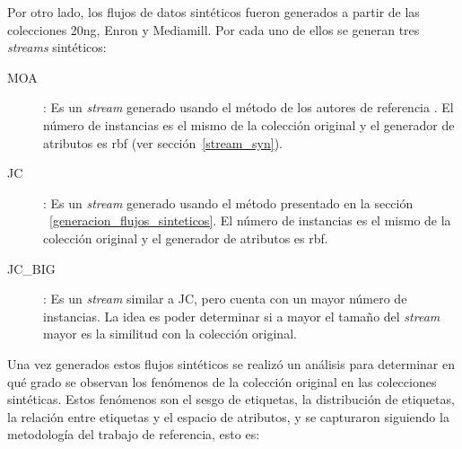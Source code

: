Por otro lado, los flujos de datos sintéticos fueron generados a partir de las
colecciones 20ng, Enron y Mediamill. Por cada uno de ellos se generan tres
\textit{streams} sintéticos:

\begin{description}

	\item[MOA]: Es un \textit{stream} generado usando el método de los autores
	      de referencia \cite{read_generating_2009}. El número de instancias es el
	      mismo de la colección original y el generador de atributos es
	      \acrfull{rbf} (ver sección~\ref{stream_syn}).

	\item[JC]: Es un \textit{stream} generado usando el método presentado en la
	      sección ~\ref{generacion_flujos_sinteticos}. El número de instancias es
	      el mismo de la colección original y el generador de atributos es
	      \acrfull{rbf}.

	\item[JC\_BIG]: Es un \textit{stream} similar a JC, pero cuenta con un mayor
	      número de instancias. La idea es poder determinar si a mayor el tamaño
	      del \textit{stream} mayor es la similitud con la colección original.

\end{description}

Una vez generados estos flujos sintéticos se realizó un análisis para determinar
en qué grado se observan los fenómenos de la colección original en las
colecciones sintéticas. Estos fenómenos son el sesgo de etiquetas, la
distribución de etiquetas, la relación entre etiquetas y el espacio de
atributos, y se capturaron siguiendo la metodología del trabajo de referencia,
esto es:

